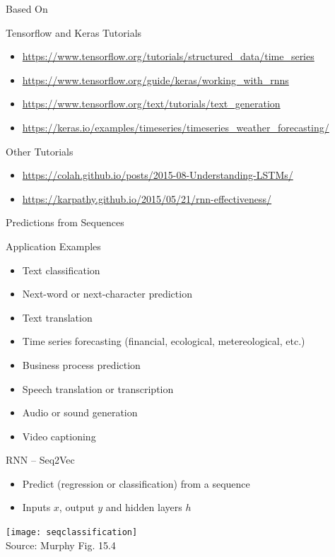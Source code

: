 \documentclass[ignorenonframetext,xcolor=x11names]{beamer}
\begin{document}
\begin{frame}{Based On}
\begin{block}{Tensorflow and Keras Tutorials}
\begin{itemize}
\item \url{https://www.tensorflow.org/tutorials/structured_data/time_series} \\
\item \url{https://www.tensorflow.org/guide/keras/working_with_rnns} \\
\item \url{https://www.tensorflow.org/text/tutorials/text_generation} \\
\item \url{https://keras.io/examples/timeseries/timeseries_weather_forecasting/} \\
\end{itemize}
\end{block}

\begin{block}{Other Tutorials}
\begin{itemize}
\item \url{https://colah.github.io/posts/2015-08-Understanding-LSTMs/}
\item \url{https://karpathy.github.io/2015/05/21/rnn-effectiveness/}
\end{itemize}
\end{block}
\end{frame}

\begin{frame}{Predictions from Sequences}
\begin{block}{Application Examples}
\begin{itemize}
   \item Text classification
   \item Next-word or next-character prediction
   \item Text translation
   \item Time series forecasting (financial, ecological, metereological, etc.)
   \item Business process prediction
   \item Speech translation or transcription
   \item Audio or sound generation
   \item Video captioning
\end{itemize}
\end{block}
\end{frame}

\begin{frame}{RNN -- Seq2Vec}
\begin{itemize}
    \item Predict (regression or classification) from a sequence
    \item Inputs $x$, output $y$ and hidden layers $h$
\end{itemize}

\centering

\texttt{[image: seqclassification]} \\

\scriptsize Source: Murphy Fig. 15.4
\end{frame}
\end{document}
